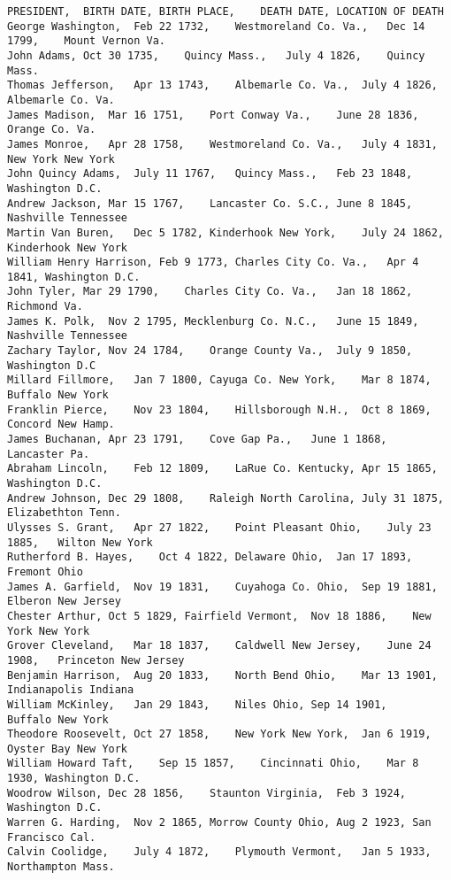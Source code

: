 \begin{verbatim}
PRESIDENT,  BIRTH DATE, BIRTH PLACE,    DEATH DATE, LOCATION OF DEATH
George Washington,  Feb 22 1732,    Westmoreland Co. Va.,   Dec 14 1799,    Mount Vernon Va.
John Adams, Oct 30 1735,    Quincy Mass.,   July 4 1826,    Quincy Mass.
Thomas Jefferson,   Apr 13 1743,    Albemarle Co. Va.,  July 4 1826,    Albemarle Co. Va.
James Madison,  Mar 16 1751,    Port Conway Va.,    June 28 1836,   Orange Co. Va.
James Monroe,   Apr 28 1758,    Westmoreland Co. Va.,   July 4 1831,    New York New York
John Quincy Adams,  July 11 1767,   Quincy Mass.,   Feb 23 1848,    Washington D.C.
Andrew Jackson, Mar 15 1767,    Lancaster Co. S.C., June 8 1845,    Nashville Tennessee
Martin Van Buren,   Dec 5 1782, Kinderhook New York,    July 24 1862,   Kinderhook New York
William Henry Harrison, Feb 9 1773, Charles City Co. Va.,   Apr 4 1841, Washington D.C.
John Tyler, Mar 29 1790,    Charles City Co. Va.,   Jan 18 1862,    Richmond Va.
James K. Polk,  Nov 2 1795, Mecklenburg Co. N.C.,   June 15 1849,   Nashville Tennessee
Zachary Taylor, Nov 24 1784,    Orange County Va.,  July 9 1850,    Washington D.C
Millard Fillmore,   Jan 7 1800, Cayuga Co. New York,    Mar 8 1874, Buffalo New York
Franklin Pierce,    Nov 23 1804,    Hillsborough N.H.,  Oct 8 1869, Concord New Hamp.
James Buchanan, Apr 23 1791,    Cove Gap Pa.,   June 1 1868,    Lancaster Pa.
Abraham Lincoln,    Feb 12 1809,    LaRue Co. Kentucky, Apr 15 1865,    Washington D.C.
Andrew Johnson, Dec 29 1808,    Raleigh North Carolina, July 31 1875,   Elizabethton Tenn.
Ulysses S. Grant,   Apr 27 1822,    Point Pleasant Ohio,    July 23 1885,   Wilton New York
Rutherford B. Hayes,    Oct 4 1822, Delaware Ohio,  Jan 17 1893,    Fremont Ohio
James A. Garfield,  Nov 19 1831,    Cuyahoga Co. Ohio,  Sep 19 1881,    Elberon New Jersey
Chester Arthur, Oct 5 1829, Fairfield Vermont,  Nov 18 1886,    New York New York
Grover Cleveland,   Mar 18 1837,    Caldwell New Jersey,    June 24 1908,   Princeton New Jersey
Benjamin Harrison,  Aug 20 1833,    North Bend Ohio,    Mar 13 1901,    Indianapolis Indiana
William McKinley,   Jan 29 1843,    Niles Ohio, Sep 14 1901,    Buffalo New York
Theodore Roosevelt, Oct 27 1858,    New York New York,  Jan 6 1919, Oyster Bay New York
William Howard Taft,    Sep 15 1857,    Cincinnati Ohio,    Mar 8 1930, Washington D.C.
Woodrow Wilson, Dec 28 1856,    Staunton Virginia,  Feb 3 1924, Washington D.C.
Warren G. Harding,  Nov 2 1865, Morrow County Ohio, Aug 2 1923, San Francisco Cal.
Calvin Coolidge,    July 4 1872,    Plymouth Vermont,   Jan 5 1933, Northampton Mass.

\end{verbatim}
